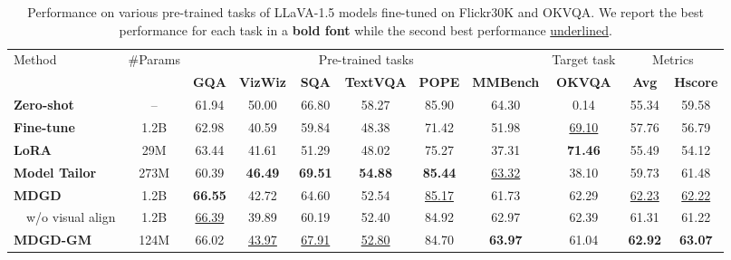 \begin{table*}[ht]
\begin{tabular}{lcccccccccc}
    \multirow{2}{*}{Method} & \multirow{2}{*}{\#Params} & \multicolumn{6}{c}{Pre-trained tasks} & \multicolumn{1}{c}{Target task} & \multicolumn{2}{c}{Metrics} \\
    \cmidrule(lr){3-8} \cmidrule(lr){9-9}  \cmidrule(lr){10-11}
    &                       & \textbf{GQA} & \textbf{VizWiz} & \textbf{SQA} & \textbf{TextVQA} & \textbf{POPE} & \textbf{MMBench} & \textbf{OKVQA} & \textbf{Avg} & \textbf{Hscore} \\
    \midrule
    \textbf{Zero-shot}       & --     & 61.94 & 50.00 & 66.80 & 58.27 & 85.90 & 64.30 & 0.14 & 55.34 & 59.58 \\
    \midrule
    \textbf{Fine-tune}     & 1.2B  & 62.98 & 40.59 & 59.84 & 48.38 & 71.42 & 51.98 & \underline{69.10} & 57.76 & 56.79 \\
    \textbf{LoRA}            & 29M   & 63.44 & 41.61 & 51.29 & 48.02 & 75.27 & 37.31 & \textbf{71.46} & 55.49 & 54.12 \\
    \textbf{Model Tailor}    & 273M   & 60.39              & \textbf{46.49} & \textbf{69.51} & \textbf{54.88} & \textbf{85.44} & \underline{63.32} & 38.10 & 59.73 & 61.48 \\
    \midrule
    \textbf{MDGD}          & 1.2B     & \textbf{66.55}     & 42.72 & 64.60 & 52.54 & \underline{85.17} & 61.73 & 62.29 & \underline{62.23} & \underline{62.22} \\
    ~~w/o visual align & 1.2B  & \underline{66.39} & 39.89 & 60.19 & 52.40 & 84.92 & 62.97 & 62.39 & 61.31 & 61.22 \\
    \textbf{MDGD-GM}  & 124M  & 66.02              & \underline{43.97} & \underline{67.91} & \underline{52.80} & 84.70 & \textbf{63.97} & 61.04 & \textbf{62.92} & \textbf{63.07} \\
    \bottomrule
  \end{tabular}
  \caption{
  Performance on various pre-trained tasks of LLaVA-1.5 models fine-tuned on Flickr30K and OKVQA. 
  We report the best performance for each task in a \textbf{bold font} while the second best performance \underline{underlined}. 
  }
  \label{tab:llava-main}
  \vspace{-.8cm}
\end{table*}
